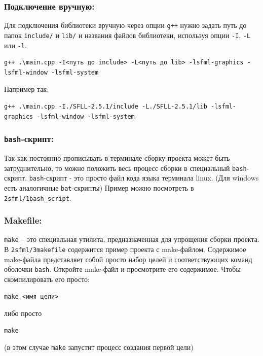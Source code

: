 \documentclass{article}
\begin{document}
\subsubsection*{Подключение вручную:}
Для подключения библиотеки вручную через опции \texttt{g++} нужно задать путь до папок \texttt{include/} и \texttt{lib/} и названия файлов библиотеки, используя опции \texttt{-I}, \texttt{-L} или \texttt{-l}. 
\begin{verbatim}
g++ .\main.cpp -I<путь до include> -L<путь до lib> -lsfml-graphics -lsfml-window -lsfml-system
\end{verbatim}
Например так:
\begin{verbatim}
g++ .\main.cpp -I./SFLL-2.5.1/include -L./SFLL-2.5.1/lib -lsfml-graphics -lsfml-window -lsfml-system
\end{verbatim}

\subsubsection*{\texttt{bash}-скрипт:} Так как постоянно прописывать в терминале сборку проекта может быть затруднительно, то можно положить весь процесс сборки в специальный \texttt{bash}-скрипт. \texttt{bash}-скрипт - это просто файл кода языка терминала linux. (Для windows есть аналогичные \texttt{bat}-скрипты) Пример можно посмотреть в \texttt{2sfml/1bash\_script}.

\subsubsection*{Makefile:} \texttt{make} -- это специальная утилита, предназначенная для упрощения сборки проекта. В \texttt{2sfml/3makefile} содержится пример проекта с make-файлом. Содержимое make-файла представляет собой просто набор целей и соответствующих команд оболочки \texttt{bash}. Откройте make-файл и просмотрите его содержимое. Чтобы скомпилировать его просто:
\begin{verbatim}
make <имя цели>
\end{verbatim}
либо просто
\begin{verbatim}
make
\end{verbatim}
(в этом случае \texttt{make} запустит процесс создания первой цели)
\end{document}
